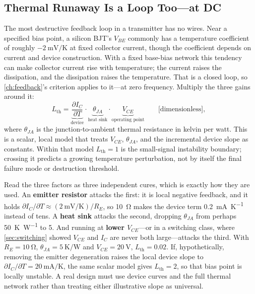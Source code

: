 \subsection{Thermal Runaway Is a Loop Too---at DC}
\label{sec:thermalrunaway}
The most destructive feedback loop in a transmitter has no wires. Near a specified
bias point, a silicon BJT's \(V_{BE}\) commonly has a temperature coefficient of
roughly \(-\SI{2}{\milli\volt\per\kelvin}\) at fixed collector current, though the
coefficient depends on current and device construction. With a fixed base-bias
network this tendency can make collector current rise with temperature; the current
raises the dissipation,
and the dissipation raises the temperature. That is a closed loop, so
\cref{ch:feedback}'s criterion applies to it---at zero frequency. Multiply the three
gains around it:
\[
L_{\text{th}}
=\underbrace{\frac{\partial I_C}{\partial T}}_{\text{device}}
\cdot\underbrace{\theta_{JA}}_{\text{heat sink}}
\cdot\underbrace{V_{CE}}_{\text{operating point}}
\qquad\text{[dimensionless]},
\]
where \(\theta_{JA}\) is the junction-to-ambient thermal resistance in kelvin per
watt. This is a scalar, local model that treats \(V_{CE}\), \(\theta_{JA}\), and the
incremental device slope as constants. Within that model \(L_{\text{th}}=1\) is the
small-signal instability boundary; crossing it predicts a growing temperature
perturbation, not by itself the final failure mode or destruction threshold.

Read the three factors as three independent cures, which is exactly how they are used.
An \textbf{emitter resistor} attacks the first: it is local negative feedback, and it
holds \(\partial I_C/\partial T\approx(\SI{2}{\milli\volt\per\kelvin})/R_E\), so
\SI{10}{\ohm} makes the device term \SI{0.2}{\milli\ampere\per\kelvin} instead of
tens. A \textbf{heat sink} attacks the second, dropping \(\theta_{JA}\) from perhaps
\SI{50}{\kelvin\per\watt} to \SI{5}{}. And running at \textbf{lower \(V_{CE}\)}---or
in a switching class, where \cref{sec:switching} showed \(V_{CE}\) and \(I_C\) are
never both large---attacks the third. With \(R_E=\SI{10}{\ohm}\),
\(\theta_{JA}=\SI{5}{\kelvin\per\watt}\) and \(V_{CE}=\SI{20}{\volt}\),
\(L_{\text{th}}=0.02\). If, hypothetically, removing the emitter degeneration raises
the local device slope to \(\partial I_C/\partial T=\SI{20}{\milli\ampere\per\kelvin}\),
the same scalar model gives \(L_{\text{th}}=2\), so that bias point is locally
unstable. A real design must use device curves and the full thermal network rather
than treating either illustrative slope as universal.

